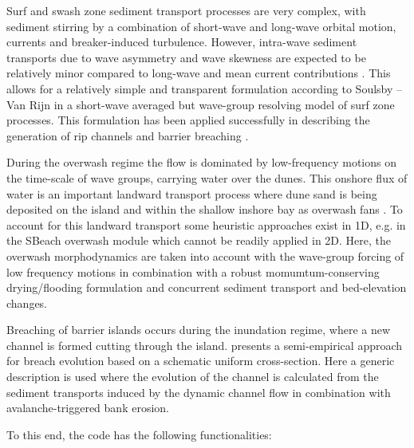 Surf and swash zone sediment transport processes are very complex, with sediment stirring by a combination of short-wave and long-wave orbital motion, currents and breaker-induced turbulence. However, intra-wave sediment transports due to wave asymmetry and wave skewness are expected to be relatively minor compared to long-wave and mean current contributions \citep{VanThielDeVries2008}. This allows for a relatively simple and transparent formulation according to Soulsby -- Van Rijn \citep{Soulsby1997} in a short-wave averaged but wave-group resolving model of surf zone processes. This formulation has been applied successfully in describing the generation of rip channels \citep{Damgaard2002, Reniers2004a} and barrier breaching \citep{Roelvink2003}. 

During the overwash regime the flow is dominated by low-frequency motions on the time-scale of wave groups, carrying water over the dunes. This onshore flux of water is an important landward transport process where dune sand is being deposited on the island and within the shallow inshore bay as overwash fans \citep[e.g.][]{Leatherman1977, WangHorwitz2007}. To account for this landward transport some heuristic approaches exist in 1D, e.g. in the SBeach overwash module \citep{Larson2004} which cannot be readily applied in 2D. Here, the overwash morphodynamics are taken into account with the wave-group forcing of low frequency motions in combination with a robust momumtum-conserving drying/flooding formulation \citep{Stelling2003} and concurrent sediment transport and bed-elevation changes.

Breaching of barrier islands occurs during the inundation regime, where a new channel is formed cutting through the island. \citet{Visser1998} presents a semi-empirical approach for breach evolution based on a schematic uniform cross-section. Here a generic description is used where the evolution of the channel is calculated from the sediment transports induced by the dynamic channel flow in combination with avalanche-triggered bank erosion. 

To this end, the code has the following functionalities:


